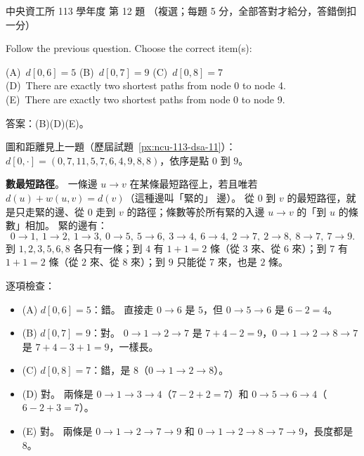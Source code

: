 \begin{pastexam}[label={px:ncu-113-dsa-12}]{中央資工所 113 學年度 第 12 題}
（複選；每題 5 分，全部答對才給分，答錯倒扣一分）

Follow the previous question. Choose the correct item(s):

(A)~$d[0,6]=5$ \quad (B)~$d[0,7]=9$ \quad (C)~$d[0,8]=7$\\
(D)~There are exactly two shortest paths from node 0 to node 4.\\
(E)~There are exactly two shortest paths from node 0 to node 9.
\end{pastexam}

\begin{pastsoln}
答案：(B)(D)(E)。

圖和距離見上一題（歷屆試題~\ref{px:ncu-113-dsa-11}）：
$d[0,\cdot] = (0, 7, 11, 5, 7, 6, 4, 9, 8, 8)$，依序是點 $0$ 到 $9$。

\textbf{數最短路徑}。 一條邊 $u \to v$ 在某條最短路徑上，若且唯若 $d(u) + w(u,v) = d(v)$（這種邊叫「緊的」
邊）。 從 $0$ 到 $v$ 的最短路徑，就是只走緊的邊、從 $0$ 走到 $v$ 的路徑；條數等於所有緊的入邊 $u \to v$
的「到 $u$ 的條數」相加。 緊的邊有：
\[
0{\to}1,\ 1{\to}2,\ 1{\to}3,\ 0{\to}5,\ 5{\to}6,\ 3{\to}4,\ 6{\to}4,\ 2{\to}7,\ 2{\to}8,\ 8{\to}7,\ 7{\to}9 .
\]
到 $1, 2, 3, 5, 6, 8$ 各只有一條；到 $4$ 有 $1 + 1 = 2$ 條（從 $3$ 來、從 $6$ 來）；到 $7$ 有
$1 + 1 = 2$ 條（從 $2$ 來、從 $8$ 來）；到 $9$ 只能從 $7$ 來，也是 $2$ 條。

逐項檢查：
\begin{itemize}
\item (A) $d[0,6] = 5$：錯。 直接走 $0 \to 6$ 是 $5$，但 $0 \to 5 \to 6$ 是 $6 - 2 = 4$。
\item (B) $d[0,7] = 9$：對。 $0 \to 1 \to 2 \to 7$ 是 $7 + 4 - 2 = 9$，$0 \to 1 \to 2 \to 8 \to 7$ 是
$7 + 4 - 3 + 1 = 9$，一樣長。
\item (C) $d[0,8] = 7$：錯，是 $8$（$0 \to 1 \to 2 \to 8$）。
\item (D) 對。 兩條是 $0 \to 1 \to 3 \to 4$（$7 - 2 + 2 = 7$）和 $0 \to 5 \to 6 \to 4$（$6 - 2 + 3 = 7$）。
\item (E) 對。 兩條是 $0 \to 1 \to 2 \to 7 \to 9$ 和 $0 \to 1 \to 2 \to 8 \to 7 \to 9$，長度都是 $8$。
\end{itemize}
\end{pastsoln}
